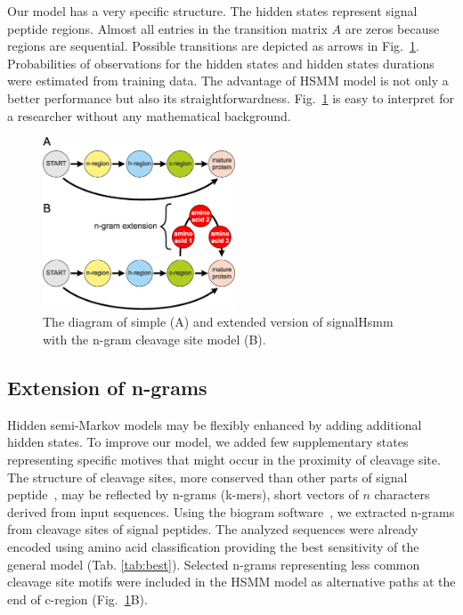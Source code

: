 \documentclass[fleqn,10pt,twoside]{gcb15submission}
\begin{document}
Our model has a very specific structure. The hidden states represent signal peptide regions.
Almost all entries in the transition matrix $A$ are zeros because regions are sequential.
Possible transitions are depicted as arrows in Fig.~\ref{fig:ngramext}.
Probabilities of observations for the hidden states and hidden states durations were estimated from training data.
The advantage of HSMM model is not only a better performance but also its straightforwardness.
Fig.~\ref{fig:ngramext} is easy to interpret for a researcher without any mathematical background.


\begin{figure}[ht]\centering
\includegraphics[width=0.51\textwidth]{figures/HSMMs.eps}
\caption{The diagram of simple (A) and extended version of signalHsmm with the n-gram cleavage site model (B).}
\label{fig:ngramext}
\end{figure}

    
\subsection*{Extension of n-grams}

Hidden semi-Markov models may be flexibly enhanced by adding additional hidden states. To improve our model, we added few supplementary states representing specific motives that might occur in the proximity of cleavage site. The structure of cleavage sites, more conserved than other parts of signal peptide~\citep{2004hillerpredisi}, may be reflected by n-grams (k-mers), short vectors of $n$ characters derived from input sequences. Using the biogram software~\citep{biogramPackage}, we extracted n-grams from cleavage sites of signal peptides. The analyzed sequences were already encoded using amino acid classification providing the best sensitivity of the general model (Tab. \ref{tab:best}). Selected n-grams representing less common cleavage site motifs were included in the HSMM model as alternative paths at the end of c-region (Fig.~\ref{fig:ngramext}B).
\end{document}

